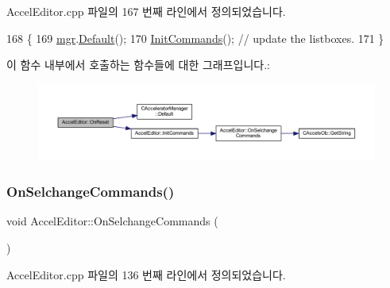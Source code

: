 Accel\+Editor.\+cpp 파일의 167 번째 라인에서 정의되었습니다.


\begin{DoxyCode}
168 \{
169   \mbox{\hyperlink{class_accel_editor_acb731e2193cb5022a95e83122651f96d}{mgr}}.\mbox{\hyperlink{class_c_accelerator_manager_aa510a36964ed209de5f7325efa713bf6}{Default}}();
170   \mbox{\hyperlink{class_accel_editor_a3c882fb85c72711e26cfe800fb11ccfa}{InitCommands}}(); \textcolor{comment}{// update the listboxes.}
171 \}
\end{DoxyCode}
이 함수 내부에서 호출하는 함수들에 대한 그래프입니다.\+:
\nopagebreak
\begin{figure}[H]
\begin{center}
\leavevmode
\includegraphics[width=350pt]{class_accel_editor_a1afed0a04125915ae1517e1b08879b8b_cgraph}
\end{center}
\end{figure}
\mbox{\label{class_accel_editor_a16cb5c73f55199115c5a4f35268ff3fa}} 
\subsubsection{\texorpdfstring{On\+Selchange\+Commands()}{OnSelchangeCommands()}}
{\footnotesize\ttfamily void Accel\+Editor\+::\+On\+Selchange\+Commands (\begin{DoxyParamCaption}{ }\end{DoxyParamCaption})\hspace{0.3cm}{\ttfamily [protected]}}



Accel\+Editor.\+cpp 파일의 136 번째 라인에서 정의되었습니다.


